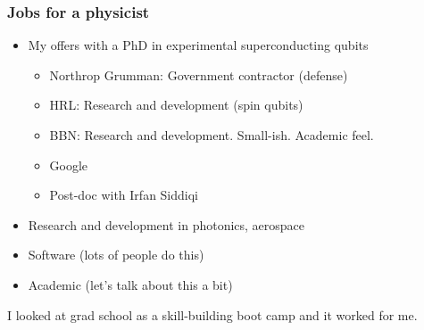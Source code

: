 \begin{frame}
\frametitle{Jobs for a physicist}
\begin{itemize}
  \item My offers with a PhD in experimental superconducting qubits
    \begin{itemize}
      \item Northrop Grumman: Government contractor (defense)
      \item HRL: Research and development (spin qubits)
      \item BBN: Research and development. Small-ish. Academic feel.
      \item Google
      \item Post-doc with Irfan Siddiqi
    \end{itemize}
  \item Research and development in photonics, aerospace
  \item Software (lots of people do this)
  \item Academic (let's talk about this a bit)
\end{itemize}
I looked at grad school as a skill-building boot camp and it worked for me.
\end{frame}
